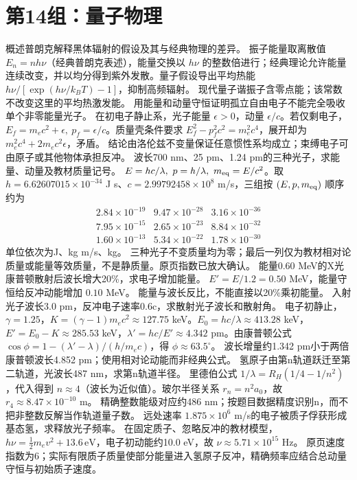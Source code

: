 \section{第14组：量子物理}
\problemtext 概述普朗克解释黑体辐射的假设及其与经典物理的差异。
\workings 振子能量取离散值 $E_n=nh\nu$（经典普朗克表述），能量交换以 $h\nu$ 的整数倍进行；经典理论允许能量连续改变，并以均分得到紫外发散。量子假设导出平均热能 $h\nu/[\exp(h\nu/k_BT)-1]$，抑制高频辐射。
\crosscheck 现代量子谐振子含零点能；该常数不改变这里的平均热激发能。
\problemtext 用能量和动量守恒证明孤立自由电子不能完全吸收单个非零能量光子。
\workings 在初电子静止系，光子能量 $\epsilon>0$，动量 $\epsilon/c$。若仅剩电子，$E_f=m_ec^2+\epsilon,\ p_f=\epsilon/c$。质量壳条件要求 $E_f^2-p_f^2c^2=m_e^2c^4$，展开却为 $m_e^2c^4+2m_ec^2\epsilon$，矛盾。
\crosscheck 结论由洛伦兹不变量保证任意惯性系均成立；束缚电子可由原子或其他物体承担反冲。
\problemtext 波长700 nm、25 pm、1.24 pm的三种光子，求能量、动量及教材质量记号。
\workings $E=hc/\lambda,\ p=h/\lambda,\ m_{\rm eq}=E/c^2$。取 $h=6.62607015\times10^{-34}$ J s、$c=2.99792458\times10^8$ m/s，三组按 $(E,p,m_{\rm eq})$ 顺序约为
\[
\begin{array}{ccc}
2.84\times10^{-19}&9.47\times10^{-28}&3.16\times10^{-36}\\
7.95\times10^{-15}&2.65\times10^{-23}&8.84\times10^{-32}\\
1.60\times10^{-13}&5.34\times10^{-22}&1.78\times10^{-30}
\end{array}
\]
单位依次为J、kg m/s、kg。
\crosscheck 三种光子不变质量均为零；最后一列仅为教材相对论质量或能量等效质量，不是静质量。原页指数已放大确认。
\problemtext 能量0.60 MeV的X光康普顿散射后波长增大20\%，求电子增加能量。
\workings $E'=E/1.2=0.50$ MeV，能量守恒给反冲动能增加 $0.10$ MeV。
\crosscheck 能量与波长反比，不能直接以20\%乘初能量。
\problemtext 入射光子波长3.0 pm，反冲电子速率0.6c，求散射光子波长和散射角。
\workings 电子初静止，$\gamma=1.25$，$K=(\gamma-1)m_ec^2\approx127.75$ keV。$E_0=hc/\lambda\approx413.28$ keV，$E'=E_0-K\approx285.53$ keV，$\lambda'=hc/E'\approx4.342$ pm。由康普顿公式 $\cos\phi=1-(\lambda'-\lambda)/(h/m_ec)$，得 $\phi\approx63.5^\circ$。
\crosscheck 波长增量约1.342 pm小于两倍康普顿波长4.852 pm；使用相对论动能而非经典公式。
\problemtext 氢原子由第n轨道跃迁至第二轨道，光波长487 nm，求第n轨道半径。
\workings 里德伯公式 $1/\lambda=R_H(1/4-1/n^2)$，代入得到 $n\approx4$（波长为近似值）。玻尔半径关系 $r_n=n^2a_0$，故 $r_4\approx8.47\times10^{-10}$ m。
\crosscheck 精确整数能级对应约486 nm；按题目数据精度识别n，而不把非整数反解当作轨道量子数。
\problemtext 远处速率 $1.875\times10^6$ m/s的电子被质子俘获形成基态氢，求释放光子频率。
\workings 在固定质子、忽略反冲的教材模型，$h\nu=\tfrac12m_ev^2+13.6\,\mathrm{eV}$，电子初动能约10.0 eV，故 $\nu\approx5.71\times10^{15}$ Hz。
\crosscheck 原页速度指数为6；实际有限质子质量使部分能量进入氢原子反冲，精确频率应结合总动量守恒与初始质子速度。
